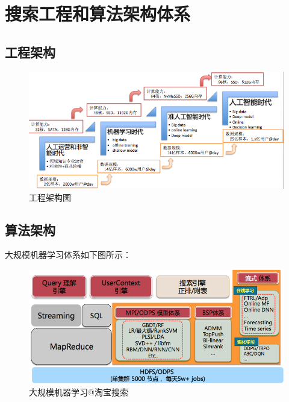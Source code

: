 
\chapter{搜索工程和算法架构体系} 
\thispagestyle{empty}

\setlength{\fboxrule}{0pt}\setlength{\fboxsep}{0cm}
\noindent\shadowbox{
\begin{tcolorbox}[arc=0mm,colback=lightblue,colframe=darkblue,title=学习目标与要求]

\end{tcolorbox}}
\setlength{\fboxrule}{1pt}\setlength{\fboxsep}{4pt} 

\section{工程架构} 

\begin{figure}[h]
\centering
\includegraphics[totalheight=2.5in]{fig/searchAlgoRoadmap.png}
\caption{工程架构图} \label{fig:gansamples}
\end{figure}

\section{算法架构} 

大规模机器学习体系如下图所示：
\begin{figure}[h]
\centering
\includegraphics[totalheight=2.5in]{fig/searchAlgoArch.png}
\caption{大规模机器学习@淘宝搜索} \label{fig:gansamples}
\end{figure}

